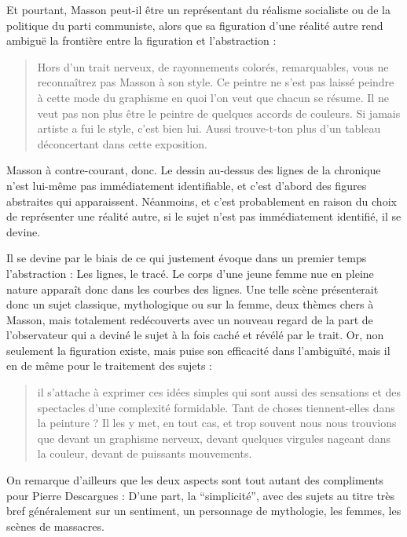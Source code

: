 	Et pourtant, Masson peut-il être un représentant du réalisme socialiste ou de la politique du parti communiste, alors que sa figuration d’une réalité autre rend ambiguë la frontière entre la figuration et l’abstraction :
	
	\begin{quote}
	 Hors d’un trait nerveux, de rayonnements colorés, remarquables, vous ne reconnaîtrez pas Masson à son style. Ce peintre ne s’est pas laissé peindre à cette mode du graphisme en quoi l’on veut que chacun se résume. Il ne veut pas non plus être le peintre de quelques accords de couleurs. Si jamais artiste a fui le style, c’est bien lui. Aussi trouve-t-ton plus d’un tableau déconcertant dans cette exposition.	
	\end{quote}
	
	 Masson à contre-courant, donc. Le dessin au-dessus des lignes de la chronique n’est lui-même pas immédiatement identifiable, et c’est d’abord des figures abstraites qui apparaissent. Néanmoins, et c’est probablement en raison du choix de représenter une réalité autre, si le sujet n’est pas immédiatement identifié, il se devine. 

Il se devine par le biais de ce qui justement évoque dans un premier temps l’abstraction : Les lignes, le tracé. Le corps d’une jeune femme nue en pleine nature apparaît donc dans les courbes des lignes. Une telle scène présenterait donc un sujet classique, mythologique ou sur la femme, deux thèmes chers à Masson, mais totalement redécouverts avec un nouveau regard de la part de l’observateur qui a deviné le sujet à la fois caché et révélé par le trait. Or, non seulement la figuration existe, mais puise son efficacité dans l’ambiguïté, mais il en de même pour le traitement des sujets : 

\begin{quote}
il s’attache à exprimer ces idées simples qui sont aussi des sensations et des spectacles d’une complexité formidable. Tant de choses tiennent-elles dans la peinture ? Il les y met, en tout cas, et trop souvent nous nous trouvions que devant un graphisme nerveux, devant quelques virgules nageant dans la couleur, devant de puissants mouvements.  	
\end{quote}
 
	On remarque d’ailleurs que les deux aspects sont tout autant des compliments pour Pierre Descargues : D’une part, la \enquote{simplicité}, avec des sujets au titre très bref généralement sur un sentiment, un personnage de mythologie, les femmes, les scènes de massacres. 


